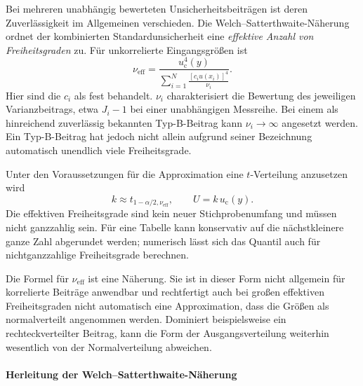 Bei mehreren unabhängig bewerteten Unsicherheitsbeiträgen ist deren
Zuverlässigkeit im Allgemeinen verschieden. Die
Welch--Satterthwaite-Näherung ordnet der kombinierten Standardunsicherheit
eine \textsl{effektive Anzahl von Freiheitsgraden} zu.
Für unkorrelierte Eingangsgrößen ist
\begin{equation}
\boxed{\nu_{\mathrm{eff}}=
\frac{u_{\mathrm c}^4(y)}{
\displaystyle\sum_{i=1}^N\frac{[c_i u(x_i)]^4}{\nu_i}}.}
\label{EffectiveDFviele}
\end{equation}
Hier sind die $c_i$ als fest behandelt. $\nu_i$ charakterisiert die
Bewertung des jeweiligen Varianzbeitrags, etwa $J_i-1$ bei einer
unabhängigen Messreihe. Bei einem als hinreichend zuverlässig bekannten
Typ-B-Beitrag kann $\nu_i\to\infty$ angesetzt werden. Ein Typ-B-Beitrag
hat jedoch nicht allein aufgrund seiner Bezeichnung automatisch unendlich
viele Freiheitsgrade.

Unter den Voraussetzungen für die Approximation eine $t$-Verteilung anzusetzen wird
\begin{equation}
k\approx t_{1-\alpha/2,\nu_{\mathrm{eff}}},\qquad
U=k\,u_{\mathrm c}(y).
\label{vollstaendigesSatterthwaite}
\end{equation}
Die effektiven Freiheitsgrade sind kein neuer Stichprobenumfang und müssen
nicht ganzzahlig sein. Für eine Tabelle kann konservativ auf die
nächstkleinere ganze Zahl abgerundet werden; numerisch lässt sich das
Quantil auch für nichtganzzahlige Freiheitsgrade berechnen.

Die Formel für $\nu_{\mathrm{eff}}$ ist eine Näherung. Sie ist in dieser
Form nicht allgemein für korrelierte Beiträge anwendbar und rechtfertigt
auch bei großen effektiven Freiheitsgraden nicht automatisch eine
Approximation, dass die Größen als normalverteilt angenommen werden. Dominiert beispielsweise ein rechteckverteilter
Beitrag, kann die Form der Ausgangsverteilung weiterhin wesentlich von
der Normalverteilung abweichen.

\paragraph{Herleitung der Welch--Satterthwaite-Näherung}

